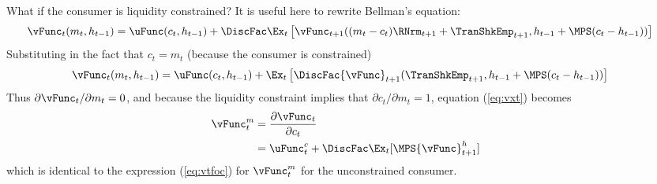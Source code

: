 \documentclass[\econtexRoot/SolvingMicroDSOPs]{subfiles}
\begin{document}
What if the consumer is liquidity constrained?  It is useful here to 
rewrite Bellman's equation:
\begin{equation}\begin{gathered}\begin{aligned}
  {\vFunc}_{t}({m}_{t},h_{t-1})  & = \uFunc({c}_{t},h_{t-1}) +  \DiscFac \Ex_{t}
                                   \left[{\vFunc}_{t+1}(({m}_{t}-{c}_{t})\RNrm_{t+1}+{\TranShkEmp}_{t+1},h_{t-1}+\MPS({c}_{t}-h_{t-1}))
                                   \right] \nonumber
\end{aligned}\end{gathered}\end{equation}
Substituting in the fact that ${c}_{t}={m}_{t}$ (because the consumer is constrained)
\begin{equation}\begin{gathered}\begin{aligned}
  {\vFunc}_{t}({m}_{t},h_{t-1})  & = \uFunc({c}_{t},h_{t-1}) +  \Ex_{t}\left[\DiscFac
                                   {\vFunc}_{t+1}({\TranShkEmp}_{t+1},h_{t-1}+\MPS({c}_{t}-h_{t-1}))\right]
                                   \nonumber
\end{aligned}\end{gathered}\end{equation}
Thus $\partial {\vFunc}_{t}/\partial {m}_{t} = 0$, and because the liquidity
constraint implies that $\partial {c}_{t}/\partial {m}_{t} = 1$,
equation (\ref{eq:vxt}) becomes
\begin{equation}\begin{gathered}\begin{aligned}
  {\vFunc}_{t}^{m}   & =  \frac{\partial {\vFunc}_{t}}{\partial {c}_{t}}
  \\              & = \uFunc_{t}^{c} + \DiscFac \Ex_{t} [\MPS {\vFunc}_{t+1}^{h}]
\end{aligned}\end{gathered}\end{equation}
which is identical to the expression (\ref{eq:vtfoc}) for ${\vFunc}_{t}^{m}$
for the unconstrained consumer.
\end{document}
